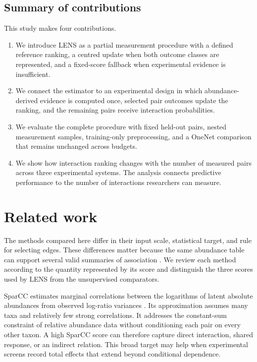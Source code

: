 \documentclass[11pt]{article}
\begin{document}
\subsection{Summary of contributions}

This study makes four contributions.
\begin{enumerate}
\item We introduce LENS as a partial measurement procedure with a defined reference ranking, a centred update when both outcome classes are represented, and a fixed-score fallback when experimental evidence is insufficient.
\item We connect the estimator to an experimental design in which abundance-derived evidence is computed once, selected pair outcomes update the ranking, and the remaining pairs receive interaction probabilities.
\item We evaluate the complete procedure with fixed held-out pairs, nested measurement samples, training-only preprocessing, and a OneNet comparison that remains unchanged across budgets.
\item We show how interaction ranking changes with the number of measured pairs across three experimental systems.
The analysis connects predictive performance to the number of interactions researchers can measure.
\end{enumerate}

\section{Related work}

The methods compared here differ in their input scale, statistical target, and rule for selecting edges.
These differences matter because the same abundance table can support several valid summaries of association \citep{matchado2021network}.
We review each method according to the quantity represented by its score and distinguish the three scores used by LENS from the unsupervised comparators.

SparCC estimates marginal correlations between the logarithms of latent absolute abundances from observed log-ratio variances \citep{friedman2012sparcc}.
Its approximation assumes many taxa and relatively few strong correlations.
It addresses the constant-sum constraint of relative abundance data without conditioning each pair on every other taxon.
A high SparCC score can therefore capture direct interaction, shared response, or an indirect relation.
This broad target may help when experimental screens record total effects that extend beyond conditional dependence.
\end{document}
